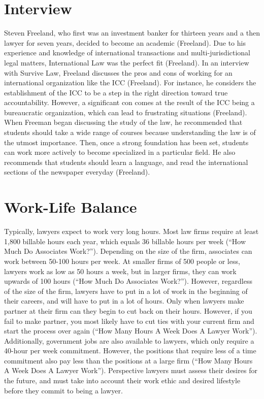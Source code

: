 \begin{multicols}{2}
\section{Interview}
    Steven Freeland, who first was an investment banker for thirteen years and a then lawyer for seven years, decided to become an academic (Freeland). Due to his experience and knowledge of international transactions and multi-jurisdictional legal matters, International Law was the perfect fit (Freeland). In an interview with Survive Law, Freeland discusses the pros and cons of working for an international organization like the ICC (Freeland). For instance, he considers the establishment of the ICC to be a step in the right direction toward true accountability. However, a significant con comes at the result of the ICC being a bureaucratic organization, which can lead to frustrating situations (Freeland). When Freeman began discussing the study of the law, he recommended that students should take a wide range of courses because understanding the law is of the utmost importance. Then, once a strong foundation has been set, students can work more actively to become specialized in a particular field. He also recommends that students should learn a language, and read the international sections of the newspaper everyday (Freeland).
\section{Work-Life Balance}
    Typically, lawyers expect to work very long hours. Most law firms require at least 1,800 billable hours each year, which equals 36 billable hours per week (“How Much Do Associates Work?”). Depending on the size of the firm, associates can work between 50-100 hours per week. At smaller firms of 500 people or less, lawyers work as low as 50 hours a week, but in larger firms, they can work upwards of 100 hours (“How Much Do Associates Work?”). However, regardless of the size of the firm, lawyers have to put in a lot of work in the beginning of their careers, and will have to put in a lot of hours. Only when lawyers make partner at their firm can they begin to cut back on their hours. However, if you fail to make partner, you most likely have to cut ties with your current firm and start the process over again (“How Many Hours A Week Does A Lawyer Work”). Additionally, government jobs are also available to lawyers, which only require a 40-hour per week commitment. However, the positions that require less of a time commitment also pay less than the positions at a large firm (“How Many Hours A Week Does A Lawyer Work”). Perspective lawyers must assess their desires for the future, and must take into account their work ethic and desired lifestyle before they commit to being a lawyer.
\end{multicols}